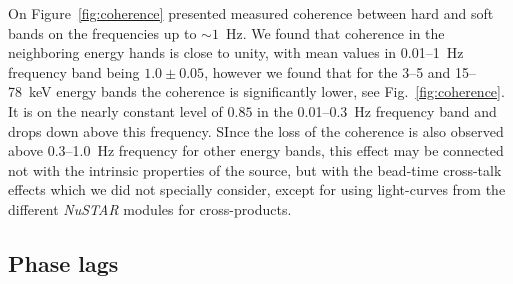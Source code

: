 \documentclass[a4paper,fleqn,usenatbib]{mnras}
\begin{document}
On Figure~\ref{fig:coherence} presented measured coherence between hard and soft bands on the frequencies up to $\sim1$~Hz. 
We found that coherence in the neighboring energy hands is close to unity, with mean values in 0.01--1~Hz frequency band being $1.0\pm0.05$, however we found that for the 3--5 and 15--78~keV energy bands the coherence is significantly lower, see Fig.~\ref{fig:coherence}. It is on the nearly constant level of $0.85$ in the 0.01--0.3~Hz frequency band and drops down above this frequency.
SInce the loss of the coherence is also observed above 0.3--1.0~Hz frequency for other energy bands, this effect may be connected not with the intrinsic properties of the source, but with the bead-time cross-talk effects which we did not specially consider, except for using light-curves from the different {\it NuSTAR} modules for cross-products.

\subsection{Phase lags}
    
\end{document}

